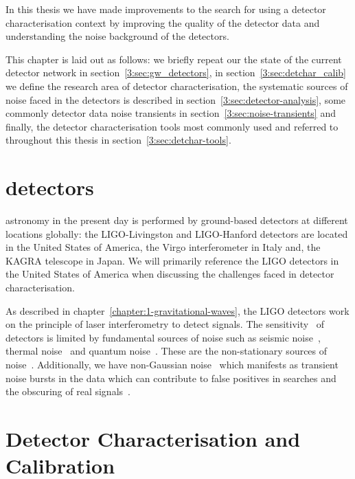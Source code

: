 
In this thesis we have made improvements to the search for \gws using a detector characterisation context by improving the quality of the detector data and understanding the noise background of the detectors. 

This chapter is laid out as follows: we briefly repeat our the state of the current \gwadj detector network in section~\ref{3:sec:gw_detectors}, in section~\ref{3:sec:detchar_calib} we define the research area of detector characterisation, the systematic sources of noise faced in the detectors is described in section~\ref{3:sec:detector-analysis}, some commonly detector data noise transients in section~\ref{3:sec:noise-transients} and finally, the detector characterisation tools most commonly used and referred to throughout this thesis in section~\ref{3:sec:detchar-tools}.

\section{\label{3:sec:gw_detectors}\Gwadj detectors}

\Gwadj astronomy in the present day is performed by ground-based detectors at different locations globally: the LIGO-Livingston and LIGO-Hanford detectors are located in the United States of America, the Virgo interferometer in Italy and, the KAGRA telescope in Japan. We will primarily reference the LIGO detectors in the United States of America when discussing the challenges faced in detector characterisation. 

As described in chapter~\ref{chapter:1-gravitational-waves}, the LIGO detectors work on the principle of laser interferometry to detect \gwadj signals. The sensitivity~\cite{aLIGO_design_curve:2018} of \gwadj detectors is limited by fundamental sources of noise such as seismic noise~\cite{Glanzer:2023}, thermal noise~\cite{thermal_noise:2018} and quantum noise~\cite{quantum_noise:2003}. These are the non-stationary sources of noise~\cite{PSD_var:2020}. Additionally, we have non-Gaussian noise~\cite{Noise_Guide:2020} which manifests as transient noise bursts in the data which can contribute to false positives in \gwadj searches and the obscuring of real \gwadj signals~\cite{GW170817:2017, GW150914_noise:2016}.

\section{\label{3:sec:detchar_calib}Detector Characterisation and Calibration}

